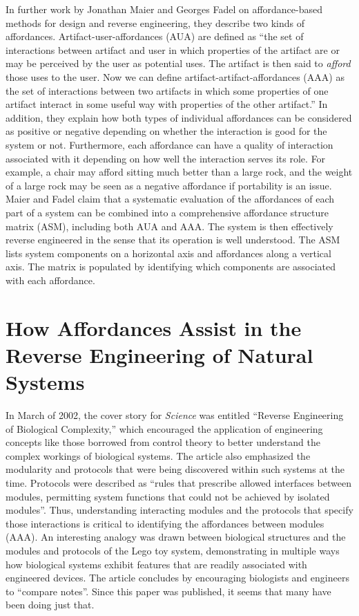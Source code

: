 In further work by Jonathan Maier and Georges Fadel on affordance-based
methods for design and reverse engineering, they describe two kinds of
affordances. Artifact-user-affordances (AUA) are defined as “the set of
interactions between artifact and user in which properties of the
artifact are or may be perceived by the user as potential uses. The
artifact is then said to \textit{afford} those uses to the user. Now we
can define artifact-artifact-affordances (AAA) as the set of
interactions between two artifacts in which some properties of one
artifact interact in some useful way with properties of the other
artifact.”\citep{maierfadel2003} In addition, they explain how both types
of individual affordances can be considered as positive or negative
depending on whether the interaction is good for the system or not.
Furthermore, each affordance can have a quality of interaction
associated with it depending on how well the interaction serves its
role. For example, a chair may afford sitting much better than a large
rock, and the weight of a large rock may be seen as a negative
affordance if portability is an issue. Maier and Fadel claim that a
systematic evaluation of the affordances of each part of a system can
be combined into a comprehensive affordance structure matrix (ASM),
including both AUA and AAA.\citep{maieretal2003}\citep{maieretal2008} The system is then
effectively reverse engineered in the sense that its operation is well
understood. The ASM lists system components on a horizontal axis and
affordances along a vertical axis. The matrix is populated by
identifying which components are associated with each affordance.

\section{How Affordances Assist in the Reverse Engineering of Natural Systems}

In March of 2002, the cover story for \textit{Science} was entitled
“Reverse Engineering of Biological Complexity,”\citep{csetedoyle2002}
which encouraged the application of engineering concepts like those
borrowed from control theory to better understand the complex workings
of biological systems. The article also emphasized the modularity and
protocols that were being discovered within such systems at the time.
Protocols were described as “rules that prescribe allowed interfaces
between modules, permitting system functions that could not be achieved
by isolated modules”. Thus, understanding interacting modules and the
protocols that specify those interactions is critical to identifying
the affordances between modules (AAA). An interesting analogy was drawn
between biological structures and the modules and protocols of the Lego
toy system, demonstrating in multiple ways how biological systems
exhibit features that are readily associated with engineered devices.
The article concludes by encouraging biologists and engineers to
“compare notes”. Since this paper was published, it seems that many
have been doing just that. 


